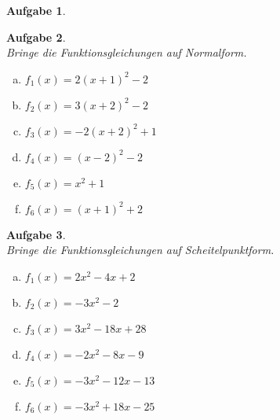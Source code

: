 \documentclass[12pt,fleqn]{article}
\theoremstyle{aufg}
\newtheorem{aufgabe}{Aufgabe}
\theoremstyle{bsp}
\begin{document}
\begin{flushleft}
\begin{aufgabe}
\end{aufgabe} 
\begin{aufgabe} ~ \\ 
Bringe die Funktionsgleichungen auf Normalform. \\ 
\begin{multicols}{3} 
\begin{enumerate}[a)] 
\item 
$f_1(x)=2 \left(x + 1\right)^{2} - 2$
\item 
$f_2(x)=3 \left(x + 2\right)^{2} - 2$
\item 
$f_3(x)=- 2 \left(x + 2\right)^{2} + 1$
\item 
$f_4(x)=\left(x - 2\right)^{2} - 2$
\item 
$f_5(x)=x^{2} + 1$
\item 
$f_6(x)=\left(x + 1\right)^{2} + 2$
\end{enumerate} 
\end{multicols} 
\end{aufgabe} 
\begin{aufgabe} ~ \\ 
Bringe die Funktionsgleichungen auf Scheitelpunktform. \\ 
\begin{multicols}{3} 
\begin{enumerate}[a)] 
\item 
$f_1(x)=2 x^{2} - 4 x + 2$
\item 
$f_2(x)=- 3 x^{2} - 2$
\item 
$f_3(x)=3 x^{2} - 18 x + 28$
\item 
$f_4(x)=- 2 x^{2} - 8 x - 9$
\item 
$f_5(x)=- 3 x^{2} - 12 x - 13$
\item 
$f_6(x)=- 3 x^{2} + 18 x - 25$
\end{enumerate} 
\end{multicols} 
\end{aufgabe} 
\end{flushleft} 
\end{document}
